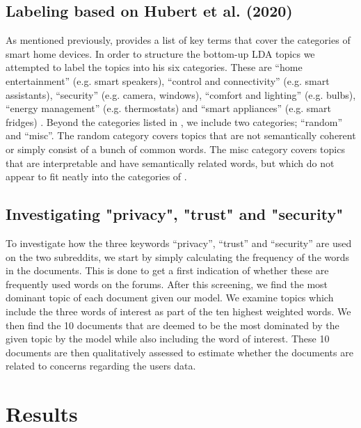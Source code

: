 \documentclass{article}
\begin{document}
    \subsection{Labeling based on Hubert et al. (2020)}
    As mentioned previously,  provides a list of key terms that cover the categories of smart home devices. In order to structure the bottom-up LDA topics we attempted to label the topics into his six categories. These are “home entertainment” (e.g. smart speakers), “control and connectivity” (e.g. smart assistants), “security” (e.g. camera, windows), “comfort and lighting” (e.g. bulbs), “energy management” (e.g. thermostats) and “smart appliances” (e.g. smart fridges) \cite[p. 1]{hubert2020take}. Beyond the categories listed in , we include two categories; “random” and “misc”. The random category covers topics that are not semantically coherent or simply consist of a bunch of common words. The misc category covers topics that are interpretable and have semantically related words, but which do not appear to fit neatly into the categories of .  
    
    \subsection{Investigating "privacy", "trust" and "security"}
    To investigate how the three keywords “privacy”, “trust” and “security” are used on the two subreddits, we start by simply calculating the frequency of the words in the documents. This is done to get a first indication of whether these are frequently used words on the forums. After this screening, we find the most dominant topic of each document given our model. We examine topics which include the three words of interest as part of the ten highest weighted words. We then find the 10 documents that are deemed to be the most dominated by the given topic by the model while also including the word of interest. These 10 documents are then qualitatively assessed to estimate whether the documents are related to concerns regarding the users data. 
    \section{Results}
\end{document}
